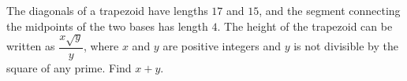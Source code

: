 The diagonals of a trapezoid have lengths $17$ and $15$, and the segment connecting the midpoints of the two bases has length $4$. The height of the trapezoid can be written as $\dfrac{x\sqrt y}{y}$, where $x$ and $y$ are positive integers and $y$ is not divisible by the square of any prime. Find $x+y$.
